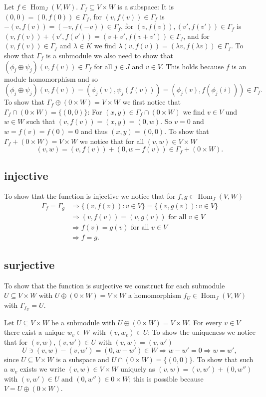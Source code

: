 \documentclass[a4paper,10pt]{article}
\newcommand{\Hom}{\operatorname{Hom}}
\begin{document}
Let $f \in \Hom_J(V,W)$. $\Gamma_f \subseteq V \times W$ is a subspace: It is $(0,0) = (0,f(0)) \in \Gamma_f$, for $(v,f(v)) \in \Gamma_f$ is $-(v,f(v)) = (-v,f(-v)) \in \Gamma_f$, for $(v,f(v)), (v',f(v')) \in \Gamma_f$ is $(v,f(v))+(v',f(v')) = (v+v',f(v+v')) \in \Gamma_f$, and for $(v,f(v)) \in \Gamma_f$ and $\lambda \in K$ we find $\lambda (v,f(v)) = (\lambda v, f(\lambda v)) \in \Gamma_f$. To show that $\Gamma_f$ is a submodule we also need to show that $(\phi_j \oplus \psi_j)(v,f(v)) \in \Gamma_f$ for all $j \in J$ and $v \in V$. This holds because $f$ is an module homomorphism and so
\[
 (\phi_j \oplus \psi_j)(v,f(v))
 = (\phi_j(v), \psi_j(f(v)))
 = (\phi_j(v), f(\phi_j(i))) \in \Gamma_f.
\]
To show that $\Gamma_f \oplus (0 \times W) = V \times W$ we first notice that $\Gamma_f \cap (0 \times W) = \{(0,0)\}$: For $(x,y) \in \Gamma_f \cap (0 \times W)$ we find $v \in V$ und $w \in W$ such that $(v,f(v)) = (x,y) = (0,w)$. So $v = 0$ and $w = f(v) = f(0) = 0$ and thus $(x,y) = (0,0)$. To show that $\Gamma_f + (0 \times W) = V \times W$ we notice that for all $(v,w) \in V \times W$
\[
 (v,w) = (v,f(v)) + (0,w-f(v)) \in \Gamma_f + (0 \times W).
\]

\subsection*{injective}
To show that the function is injective we notice that for $f,g \in \Hom_J(V,W)$
\begin{align*}
 \Gamma_f = \Gamma_g
 &\Rightarrow \{(v,f(v)) : v \in V\} = \{(v,g(v)) : v \in V\} \\
 &\Rightarrow (v,f(v)) = (v,g(v)) \text{ for all } v \in V \\
 &\Rightarrow f(v) = g(v) \text{ for all } v \in V \\
 &\Rightarrow f = g.
\end{align*}

\subsection*{surjective}
To show that the function is surjective we construct for each submodule $U \subseteq V \times W$ with $U \oplus (0 \times W) = V \times W$ a homomorphism $f_U \in \Hom_J(V,W)$ with $\Gamma_{f_U} = U$.

Let $U \subseteq V \times W$ be a submodule with $U \oplus (0 \times W) = V \times W$. For every $v \in V$ there exist a unique $w_v \in W$ with $(v,w_v) \in U$: To show the uniqueness we notice that for $(v,w), (v,w') \in U$ with $(v,w) = (v,w')$
\[
 U \ni (v,w)-(v,w') = (0,w-w') \in W \Rightarrow w-w' = 0 \Rightarrow w=w',
\]
since $U \subseteq V \times W$ is a subspace and $U \cap (0 \times W) = \{(0,0)\}$. To show that such a $w_v$ exists we write $(v,w) \in V \times W$ uniquely as $(v,w) = (v,w') + (0,w'')$ with $(v,w') \in U$ and $(0,w'') \in 0 \times W$; this is possible because $V =  U \oplus (0 \times W)$.
\end{document}
